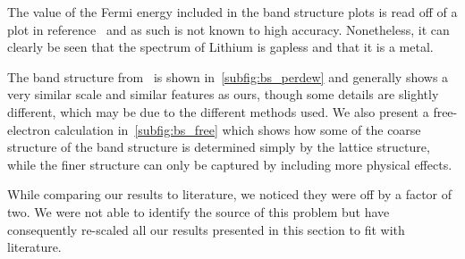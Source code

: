 \documentclass[a4paper,DIV=12,english]{scrartcl}
\begin{document}
The value of the Fermi energy included in the band structure plots is read off of a plot in reference~\cite{perdew_li} and as such is not known to high accuracy. Nonetheless, it can clearly be seen that the spectrum of Lithium is gapless and that it is a metal.

The band structure from~\cite{perdew_li} is shown in~\ref{subfig:bs_perdew} and generally shows a very similar scale and similar features as ours, though some details are slightly different, which may be due to the different methods used. We also present a free-electron calculation in~\ref{subfig:bs_free} which shows how some of the coarse structure of the band structure is determined simply by the lattice structure, while the finer structure can only be captured by including more physical effects.

While comparing our results to literature, we noticed they were off by a factor of two. We were not able to identify the source of this problem but have consequently re-scaled all our results presented in this section to fit with literature.
\end{document}
